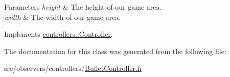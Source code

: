 \begin{DoxyParams}{\-Parameters}
{\em height} & \-The height of our game area. \\
\hline
{\em width} & \-The width of our game area. \\
\hline
\end{DoxyParams}


\-Implements \hyperlink{classcontrollers_1_1Controller_ae4eb0768c65456a1ffe84260c5713013}{controllers\-::\-Controller}.



\-The documentation for this class was generated from the following file\-:\begin{DoxyCompactItemize}
\item 
src/observers/controllers/\hyperlink{BulletController_8h}{\-Bullet\-Controller.\-h}\end{DoxyCompactItemize}
